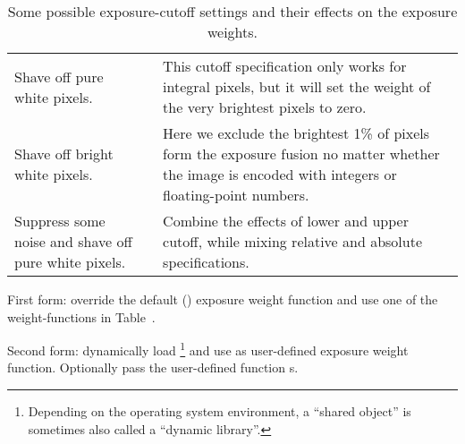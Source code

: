 \begin{codelist}
\begin{table}[htbp]
\begin{maxipage}
\begin{tabular}{p{.3\linewidth}lp{.3\linewidth}}
        Shave off pure white pixels. & \option{--exposure-cutoff=0:-1} &
        This cutoff specification only works for integral pixels, but
        it will set the weight of the very brightest pixels to
        zero. \\

        Shave off bright white pixels. &
        \option{--exposure-cutoff=0:-1\%} & Here we exclude the
        brightest 1\% of pixels form the exposure fusion no matter
        whether the image is encoded with integers or floating-point
        numbers. \\

        Suppress some noise and shave off pure white pixels. &
        \option{--exposure-cutoff=5\%:-1} & Combine the effects of lower
        and upper cutoff, while mixing relative and absolute
        specifications.
      \end{tabular}
    \end{maxipage}

    \caption[Flexible exposure cutoff]{Some possible exposure-cutoff
      settings and their effects on the exposure
      weights.\label{tab:flexible-exposure-cutoff}}
  \end{table}


  \label{opt:exposure-weight-function}%
\item[\itempar{--exposure-weight-function=\metavar{WEIGHT-FUNCTION}~\textrm{(\oldstylefirst~form)}
    \\ --exposure-weight-function=\metavar{SHARED-OBJECT}:\feasiblebreak
    \metavar{SYMBOL}\optional{:\feasiblebreak
      \metavar{ARGUMENT}\optional{:\dots}}~\textrm{(\oldstylesecond~form)}}]\itemend
  First form: override the default
  () exposure weight
  function and use one of the weight-functions in
  Table~.


  \noindent Second form: dynamically load
  \footnote{Depending on the operating system environment, a ``shared
    object'' is sometimes also called a ``dynamic
    library''.%
    }
  and use  as user-defined exposure weight function.
  Optionally pass the user-defined function s.


\end{codelist}
